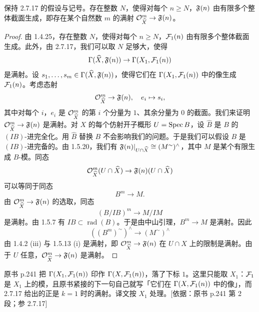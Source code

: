 \begin{corollary}\label{it:2.7.18}
保持 2.7.17 的假设与记号。存在整数 $N$，使得对每个 $n\ge N$，$\mathfrak{F}(n)$ 由有限多个整体截面生成，即存在某个自然数 $m$ 的满射 $\mathcal{O}_{\widehat{X}}^m\to\mathfrak{F}(n)$。
\end{corollary}

\begin{proof}
由 1.4.25，存在整数 $N$，使得对每个 $n\ge N$，$\mathcal{F}_1(n)$ 由有限多个整体截面生成。此外，由 2.7.17，我们可以取 $N$ 足够大，使得
\begin{equation*}
\Gamma(\widehat{X},\mathfrak{F}(n))\to\Gamma(X_1,\mathcal{F}_1(n))
\end{equation*}
是满射。设 $s_1,\dots,s_m\in\Gamma(\widehat{X},\mathfrak{F}(n))$，使得它们在 $\Gamma(X_1,\mathcal{F}_1(n))$ 中的像生成 $\mathcal{F}_1(n)$。考虑态射
\begin{equation*}
\mathcal{O}_{\widehat{X}}^m\to\mathfrak{F}(n),\quad e_i\mapsto s_i,
\end{equation*}
其中对每个 $i$，$e_i$ 是 $\mathcal{O}_{\widehat{X}}^m$ 的第 $i$ 个分量为 $1$、其余分量为 $0$ 的截面。我们来证明 $\mathcal{O}_{\widehat{X}}^m\to\mathfrak{F}(n)$ 是满射。对 $X$ 的每个仿射开子概形 $U=\operatorname{Spec} B$，设 $\widehat{B}$ 是 $B$ 的 $(IB)$-进完全化。用 $\widehat{B}$ 替换 $B$ 不会影响我们的问题。于是我们可以假设 $B$ 是 $(IB)$-进完备的。由 1.5.20，我们有 $\mathfrak{F}(n)|_{U\cap\widehat{X}}\cong(M^{\sim})^{\wedge}$，其中 $M$ 是某个有限生成 $B$-模。同态
\begin{equation*}
\mathcal{O}_{\widehat{X}}^m(U\cap\widehat{X})\to\mathfrak{F}(n)(U\cap\widehat{X})
\end{equation*}
可以等同于同态
\begin{equation*}
B^m\to M.
\end{equation*}
由 $\mathcal{O}_{\widehat{X}}^m\to\mathfrak{F}(n)$ 的选取，同态
\begin{equation*}
(B/IB)^m\to M/IM
\end{equation*}
是满射。由 1.5.7 有 $IB\subset\operatorname{rad}(B)$。于是由中山引理，$B^m\to M$ 是满射。因此
\begin{equation*}
((B^m)^{\sim})^{\wedge}\to(M^{\sim})^{\wedge}
\end{equation*}
由 1.4.2 (iii) 与 1.5.13 (i) 是满射，即 $\mathcal{O}_{\widehat{X}}^m\to\mathfrak{F}(n)$ 在 $U\cap\widehat{X}$ 上的限制是满射。由于 $U$ 任意，$\mathcal{O}_{\widehat{X}}^m\to\mathfrak{F}(n)$ 是满射。
\end{proof}

\begin{tnote}
原书 p.241 把 $\Gamma(X_1,\mathcal{F}_1(n))$ 印作 $\Gamma(X,\mathcal{F}_1(n))$，落了下标 $1$。这里只能取 $X_1$：$\mathcal{F}_1$ 是 $X_1$ 上的模，且原书紧接的下一句自己就写「它们在 $\Gamma(X,\mathcal{F}_1(n))$ 中的像」，而 2.7.17 给出的正是 $k=1$ 时的满射。译文按 $X_1$ 处理。[依据：原书 p.241 第 2 段；参 2.7.17]
\end{tnote}

